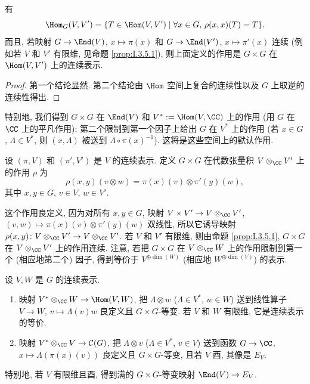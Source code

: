 \begin{proposition}[交错算子与不动点]
\label{prop:IV.3.4}
有
\[
\Hom_G(V, V') = \{T \in \Hom(V, V') \mid \forall x \in G,\, \rho(x, x)(T) = T\}.
\]
而且, 若映射 $G \to \End(V)$, $x \longmapsto \pi(x)$ 和 $G \to \End(V')$, $x \longmapsto \pi'(x)$ 连续 (例如若 $V$ 和 $V'$ 有限维, 见命题 \ref{prop:I.3.5.1}), 则上面定义的作用是 $G \times G$ 在 $\Hom(V, V')$ 上的连续表示.
\end{proposition}

\begin{proof}
第一个结论显然. 第二个结论由 $\Hom$ 空间上复合的连续性以及 $G$ 上取逆的连续性得出.
\end{proof}

特别地, 我们得到 $G \times G$ 在 $\End(V)$ 和 $V^* := \Hom(V, \CC)$ 上的作用 (用 $G$ 在 $\CC$ 上的平凡作用); 第二个限制到第一个因子上给出 $G$ 在 $V^*$ 上的作用 (若 $x \in G$, $\Lambda \in V^*$, 则 $(x, \Lambda)$ 被送到 $\Lambda \circ \pi(x)^{-1}$). 这将是这些空间上的默认作用.

\begin{definition}
\label{def:IV.3.5}
设 $(\pi, V)$ 和 $(\pi', V')$ 是 $V$ 的连续表示. 定义 $G \times G$ 在代数张量积 $V \otimes_{\CC}V'$ 上的作用 $\rho$ 为
\[
\rho(x, y)(v \otimes w) = \pi(x)(v) \otimes \pi'(y)(w),
\]
其中 $x, y \in G$, $v \in V$, $w \in V'$.
\end{definition}

这个作用良定义, 因为对所有 $x, y \in G$, 映射 $V \times V' \to V \otimes_{\CC}V'$, $(v, w) \longmapsto \pi(x)(v) \otimes \pi'(y)(w)$ 双线性, 所以它诱导映射 $\rho(x, y) \colon V \otimes_{\CC}V' \to V \otimes_{\CC}V'$. 若 $V$ 和 $V'$ 有限维, 则由命题 \ref{prop:I.3.5.1}, $G \times G$ 在 $V \otimes_{\CC}V'$ 上的作用连续.
注意, 若把 $G \times G$ 在 $V \otimes_{\CC}W$ 上的作用限制到第一个 (相应地第二个) 因子, 得到等价于 $V^{\oplus \dim(W)}$ (相应地 $W^{\oplus \dim(V)}$) 的表示.

\begin{proposition}
\label{prop:IV.3.6}
设 $V, W$ 是 $G$ 的连续表示.
\begin{enumerate}
\item[(i)] 映射 $V^* \otimes_{\CC}W \to \Hom(V, W)$, 把 $\Lambda \otimes w$ ($\Lambda \in V^*$, $w \in W$) 送到线性算子 $V \to W$, $v \longmapsto \Lambda(v)w$ 良定义且 $G \times G$-等变. 若 $V$ 和 $W$ 有限维, 它是连续表示的等价.
\item[(ii)] 映射 $V^* \otimes_{\CC}V \to \mathcal{C}(G)$, 把 $\Lambda \otimes v$ ($\Lambda \in V^*$, $v \in V$) 送到函数 $G \to \CC$, $x \longmapsto \Lambda(\pi(x)(v))$ 良定义且 $G \times G$-等变, 且若 $V$ 酉, 其像是 $E_V$.
\end{enumerate}
特别地, 若 $V$ 有限维且酉, 得到满的 $G \times G$-等变映射 $\End(V) \to E_V$.
\end{proposition}

